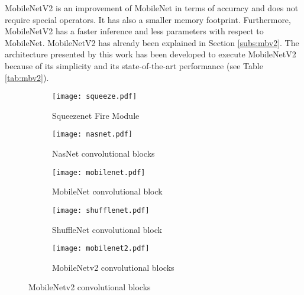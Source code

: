 MobileNetV2 \cite{sandler_mobilenetv2_2019} is an improvement of MobileNet in terms of accuracy and does not require special operators. It has also a smaller memory footprint. Furthermore, MobileNetV2 has a faster inference and less parameters with respect to MobileNet. MobileNetV2 has already been explained in Section \ref{subs:mbv2}. The architecture presented by this work has been developed to execute MobileNetV2 because of its simplicity and its state-of-the-art performance (see Table \ref{tab:mbv2}).
%
\begin{figure}
    \centering
    \begin{subfigure}{0.49\linewidth}
        \centering
        \texttt{[image: squeeze.pdf]}
        \caption{Squeezenet Fire Module\cite{iandola_squeezenet_2016}}
        \label{fig:archi_building_block:sqn}
    \end{subfigure}
    \begin{subfigure}{0.49\linewidth}
        \centering
        \texttt{[image: nasnet.pdf]}
        \caption{NasNet convolutional blocks \cite{zoph_learning_2018}}
        \label{fig:archi_building_block:nasn}
    \end{subfigure}
    \begin{subfigure}{0.49\linewidth}
        \centering
        \texttt{[image: mobilenet.pdf]}
        \caption{MobileNet convolutional block \cite{howard_mobilenets_2017}}
        \label{fig:archi_building_block:mbn}
    \end{subfigure}
    \begin{subfigure}{0.49\linewidth}
        \centering
        \texttt{[image: shufflenet.pdf]}
        \caption{ShuffleNet convolutional block \cite{zhang_shufflenet_2018}}
        \label{fig:archi_building_block:shn}
    \end{subfigure}
    \begin{subfigure}{0.49\linewidth}
        \centering
        \texttt{[image: mobilenet2.pdf]}
        \caption{MobileNetv2 convolutional blocks \cite{sandler_mobilenetv2_2019}}
        \label{fig:archi_building_block:mb2n}
    \end{subfigure}
    \label{fig:archi_building_block}
\end{figure}


